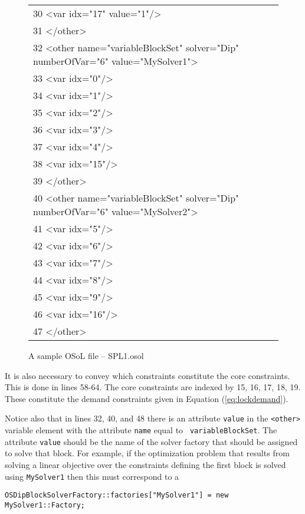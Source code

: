 \documentclass[11pt]{article}
\begin{document}
{\begin{figure}[hp]
{{{\begin{tabular}{@{}l@{}}
30              <var idx="17" value="1"/>\\
31           </other>\\
32           <other name="variableBlockSet" solver="Dip" numberOfVar="6" value="MySolver1">\\
33              <var idx="0"/>\\
34              <var idx="1"/>\\
35              <var idx="2"/>\\
36              <var idx="3"/>\\
37              <var idx="4"/>\\
38              <var idx="15"/>\\
39           </other>\\
40           <other name="variableBlockSet" solver="Dip" numberOfVar="6" value="MySolver2">\\
41              <var idx="5"/>\\
42              <var idx="6"/>\\
43              <var idx="7"/>\\
44              <var idx="8"/>\\
45              <var idx="9"/>\\
46              <var idx="16"/>\\
47           </other>\\
\end{tabular} }}} \medskip
\caption{A sample OSoL file -- SPL1.osol}\label{figure:parinc-osil}
\end{figure}
} %


It is also necessary to convey which constraints constitute the core
constraints. This is done in lines 58-64. The core constraints are indexed by
15, 16, 17, 18, 19. These constitute the demand constraints given in Equation
(\ref{eq:lockdemand}). 


Notice also that in lines 32, 40, and 48 there is an attribute {\tt value} in
the {\tt <other>} variable element with the attribute {\tt name} equal to {\tt
variableBlockSet}.  The attribute {\tt value} should be the name of the solver
factory that should be assigned to solve that block. For example, if the
optimization problem that results from solving a linear objective over the
constraints defining the first block is solved using {\tt MySolver1} then this
must correspond to a 

\begin{verbatim}
OSDipBlockSolverFactory::factories["MySolver1"] = new
MySolver1::Factory;
\end{verbatim}  
\end{document}
